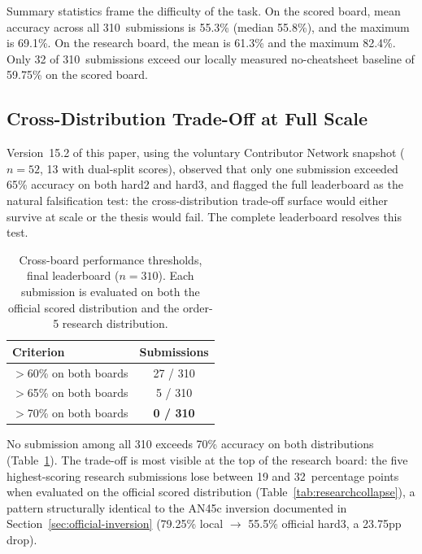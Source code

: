 Summary statistics frame the difficulty of the task. On the scored
board, mean accuracy across all 310~submissions is 55.3\% (median
55.8\%), and the maximum is 69.1\%. On the research board, the mean is
61.3\% and the maximum 82.4\%. Only 32 of 310~submissions exceed our
locally measured no-cheatsheet baseline of 59.75\% on the scored board.

\subsection{Cross-Distribution Trade-Off at Full Scale}
\label{sec:official-tradeoff}

Version~15.2 of this paper, using the voluntary Contributor Network
snapshot ($n{=}52$, 13 with dual-split scores), observed that only one
submission exceeded 65\% accuracy on both hard2 and hard3, and flagged
the full leaderboard as the natural falsification test: the
cross-distribution trade-off surface would either survive at scale or
the thesis would fail. The complete leaderboard resolves this test.

\begin{table}[t]
\centering
\caption{Cross-board performance thresholds, final leaderboard
($n{=}310$). Each submission is evaluated on both the official scored
distribution and the order-5 research distribution.}
\label{tab:dualthreshold}
\begin{tabular}{lc}
\toprule
Criterion & Submissions \\
\midrule
$>$60\% on both boards & 27 / 310 \\
$>$65\% on both boards & 5 / 310 \\
$>$70\% on both boards & \textbf{0 / 310} \\
\bottomrule
\end{tabular}
\end{table}

No submission among all 310 exceeds 70\% accuracy on both distributions
(Table~\ref{tab:dualthreshold}). The trade-off is most visible at the
top of the research board: the five highest-scoring research submissions
lose between 19 and 32~percentage points when evaluated on the official
scored distribution (Table~\ref{tab:researchcollapse}), a pattern
structurally identical to the AN45c inversion documented in
Section~\ref{sec:official-inversion} (79.25\% local $\rightarrow$ 55.5\%
official hard3, a 23.75pp drop).


